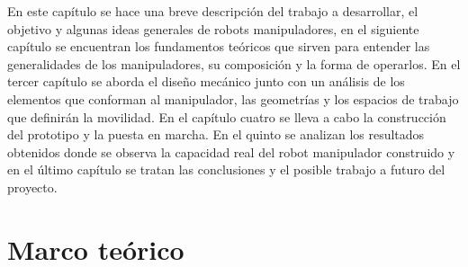 En este capítulo se hace una breve descripción del trabajo a desarrollar, el objetivo y algunas ideas generales de robots manipuladores, en el siguiente capítulo se encuentran los fundamentos teóricos que sirven para entender las generalidades de los manipuladores, su composición y la forma de operarlos. En el tercer capítulo se aborda el diseño mecánico junto con un análisis de los elementos que conforman al manipulador, las geometrías y los espacios de trabajo que definirán la movilidad. En el capítulo cuatro se lleva a cabo la construcción del prototipo y la puesta en marcha. En el quinto se analizan los resultados obtenidos donde se observa la capacidad real del robot manipulador construido y en el último capítulo se tratan las conclusiones y el posible trabajo a futuro del proyecto.

\section{Marco teórico}


